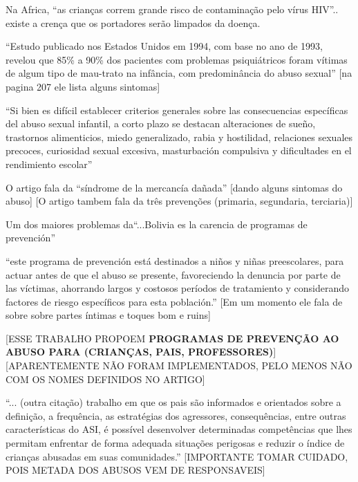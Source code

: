 Na Africa, ``as crianças correm grande risco de contaminação pelo vírus HIV''.. existe a crença que os portadores serão limpados da doença. \cite{aded2006abuso}

``Estudo publicado nos Estados Unidos em 1994, com base no ano de 1993, revelou que 85\% a 90\% dos pacientes com problemas psiquiátricos foram vítimas de algum tipo de mau-trato na infância, com predominância do abuso sexual''\cite{aded2006abuso} [na pagina 207 ele lista alguns sintomas]



``Si bien es difícil establecer criterios generales sobre las consecuencias específicas del abuso sexual infantil, a corto plazo se destacan alteraciones de sueño, trastornos alimenticios, miedo generalizado, rabia y hostilidad, relaciones sexuales precoces, curiosidad sexual excesiva, masturbación compulsiva y dificultades en el rendimiento escolar'' \cite{mariscal2003programa}

O artigo fala da ``síndrome de la mercancía dañada'' [dando alguns sintomas do abuso] [O artigo tambem fala da três prevenções (primaria, segundaria, terciaria)] \cite{mariscal2003programa}

Um dos maiores problemas da``...Bolivia es la carencia de programas de prevención'' \cite{mariscal2003programa}


``este programa de prevención está destinados a niños y niñas preescolares, para actuar antes de que el abuso se presente, favoreciendo la denuncia por parte de las víctimas, ahorrando largos y costosos períodos de tratamiento y considerando factores de riesgo específicos para esta población.'' [Em um momento ele fala de sobre sobre partes íntimas e toques bom e ruins] \cite{mariscal2003programa}

[ESSE TRABALHO PROPOEM \textbf{PROGRAMAS DE PREVENÇÃO AO ABUSO PARA (CRIANÇAS, PAIS, PROFESSORES)}] \cite{mariscal2003programa} [APARENTEMENTE NÃO FORAM IMPLEMENTADOS, PELO MENOS NÃO COM OS NOMES DEFINIDOS NO ARTIGO]




``... (outra citação) trabalho  em  que  os  pais  são informados  e  orientados  sobre  a  definição,  a  frequência,  as  estratégias  dos  agressores, consequências, entre outras características do ASI, é possível desenvolver determinadas competências  que  lhes  permitam  enfrentar  de  forma  adequada  situações  perigosas  e reduzir  o  índice  de  crianças  abusadas  em  suas  comunidades.'' [IMPORTANTE TOMAR CUIDADO, POIS METADA DOS ABUSOS VEM DE RESPONSAVEIS] \cite{pinto2017avaliaccao}

